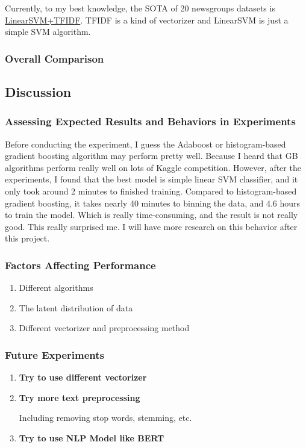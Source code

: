 \documentclass[twocolumn, draft]{extarticle}
\begin{document}
Currently, to my best knowledge, the SOTA of 20 newsgroups datasets is \href{https://arxiv.org/abs/2211.02563v1}{LinearSVM+TFIDF}. TFIDF is a kind of vectorizer and LinearSVM is just a simple SVM algorithm.

\subsubsection{Overall Comparison}

\subsection{Discussion}
\subsubsection{Assessing Expected Results and Behaviors in Experiments}

Before conducting the experiment, I guess the Adaboost or histogram-based gradient boosting algorithm may perform pretty well. Because I heard that GB algorithms perform really well on lots of Kaggle competition. However, after the experiments, I found that the best model is simple linear SVM classifier, and it only took around 2 minutes to finished training. Compared to histogram-based gradient boosting, it takes nearly 40 minutes to binning the data, and 4.6 hours to train the model. Which is really time-consuming, and the result is not really good. This really surprised me. I will have more research on this behavior after this project.

\subsubsection{Factors Affecting Performance}

\begin{enumerate}
\item Different algorithms
\item The latent distribution of data
\item Different vectorizer and preprocessing method
\end{enumerate}

\subsubsection{Future Experiments}

\begin{enumerate}
\item \textbf{Try to use different vectorizer}
\item \textbf{Try more text preprocessing}

Including removing stop words, stemming, etc.

\item \textbf{Try to use NLP Model like BERT}
\end{enumerate}
\end{document}
